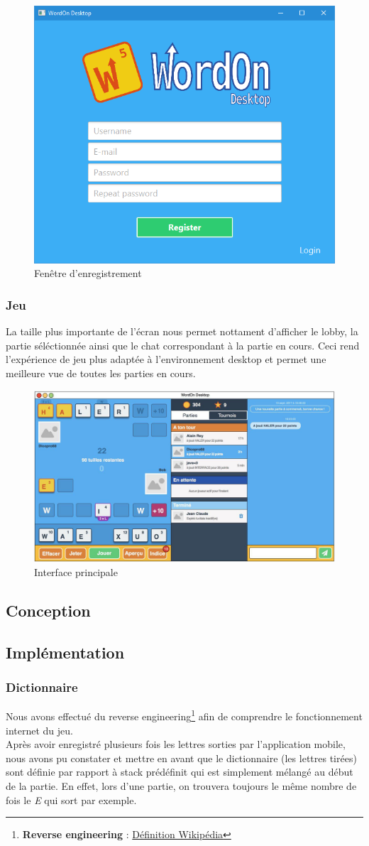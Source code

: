 \documentclass[a4paper,12pt]{article}
\begin{document}
		\begin{figure}[h]
			\centering
			\includegraphics[width=0.4\linewidth]{img/signup.jpg}
			\caption{Fenêtre d'enregistrement}
		\end{figure}
		
		\subsubsection{Jeu}
		La taille plus importante de l'écran nous permet nottament d'afficher le lobby, la partie séléctionnée ainsi que le chat correspondant à la partie en cours. Ceci rend l'expérience de jeu plus adaptée à l'environnement desktop et permet une meilleure vue de toutes les parties en cours.
		
		\begin{figure}[h]
			\centering
			\includegraphics[width=0.6\linewidth]{img/main.jpg}
			\caption{Interface principale}
		\end{figure}
		
	\subsection{Conception}
	
	\subsection{Implémentation}
		\subsubsection{Dictionnaire}
		Nous avons effectué du reverse engineering\footnote{\textbf{Reverse engineering} :  \href{https://fr.wikipedia.org/wiki/R\%C3\%A9tro-ing\%C3\%A9nierie}{Définition Wikipédia}} afin de comprendre le fonctionnement internet du jeu.\\
		Après avoir enregistré plusieurs fois les lettres sorties par l'application mobile, nous avons pu constater et mettre en avant que le dictionnaire (les lettres tirées) sont définie par rapport à stack prédéfinit qui est simplement mélangé au début de la partie. En effet, lors d'une partie, on trouvera toujours le même nombre de fois le \textit{E} qui sort par exemple.
		
\end{document}
